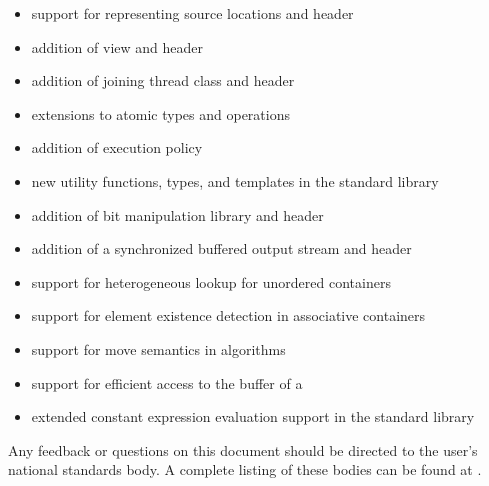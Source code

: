 \begin{itemize}
\item support for representing source locations and  header
\item addition of  view and  header
\item addition of joining thread class and  header
\item extensions to atomic types and operations
\item addition of  execution policy
\item new utility functions, types, and templates in the standard library
\item addition of bit manipulation library and  header
\item addition of a synchronized buffered output stream and  header
\item support for heterogeneous lookup for unordered containers
\item support for element existence detection in associative containers
\item support for move semantics in  algorithms
\item support for efficient access to the buffer of a 
\item extended constant expression evaluation support in the standard library
\end{itemize}

Any feedback or questions on this document
should be directed to the user's national standards body.
A complete listing of these bodies can be found at
\href{http://www.iso.org/members.html}{}.

\let\libheader\OldLibHeader

